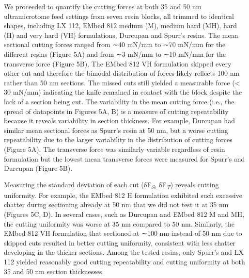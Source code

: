 \documentclass{article}
\begin{document}

We proceeded to quantify the cutting forces at both 35 and 50 nm ultramicrotome feed settings from seven resin blocks, all trimmed to identical shapes, including LX 112, EMbed 812 medium (M), medium hard (MH), hard (H) and very hard (VH) formulations, Durcupan and Spurr’s resins. The mean sectional cutting forces ranged from ∼40 mN/mm to ∼70 mN/mm for the different resins (Figure 5A) and from ∼3 mN/mm to ∼10 mN/mm for the transverse force (Figure 5B). The EMbed 812 VH formulation skipped every other cut and therefore the bimodal distribution of forces likely reflects 100 nm rather than 50 nm sections. The missed cuts still yielded a measurable force (< 30 mN/mm) indicating the knife remained in contact with the block despite the lack of a section being cut. The variability in the mean cutting force (i.e., the spread of datapoints in Figures 5A, B) is a measure of cutting repeatability because it reveals variability in section thickness. For example, Durcupan had similar mean sectional forces as Spurr’s resin at 50 nm, but a worse cutting repeatability due to the larger variability in the distribution of cutting forces (Figure 5A). The transverse force was similarly variable regardless of resin formulation but the lowest mean transverse forces were measured for Spurr’s and Durcupan (Figure 5B).

Measuring the standard deviation of each cut (δF\textsubscript{\emph{S}}, δF\textsubscript{\emph{T}}) reveals cutting uniformity. For example, the EMbed 812 H formulation exhibited such excessive chatter during sectioning already at 50 nm that we did not test it at 35 nm (Figures 5C, D). In several cases, such as Durcupan and EMbed 812 M and MH, the cutting uniformity was worse at 35 nm compared to 50 nm. Similarly, the EMbed 812 VH formulation that sectioned at ∼100 nm instead of 50 nm due to skipped cuts resulted in better cutting uniformity, consistent with less chatter developing in the thicker sections. Among the tested resins, only Spurr’s and LX 112 yielded reasonably good cutting repeatability and cutting uniformity at both 35 and 50 nm section thicknesses.
\end{document}
